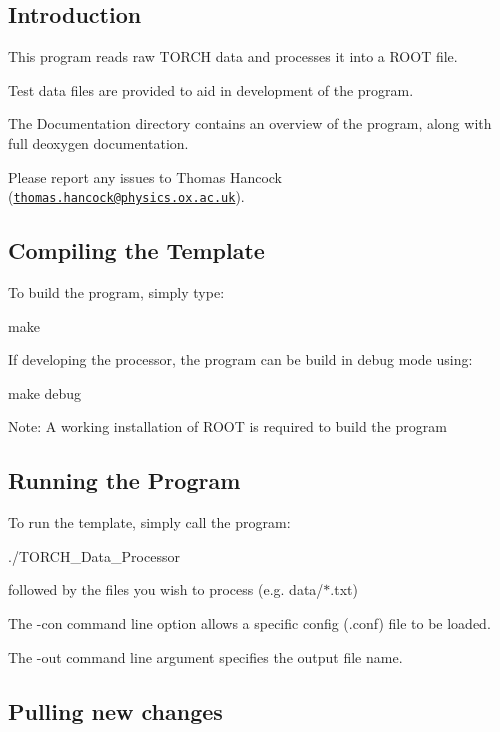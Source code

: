 \subsection*{Introduction}

This program reads raw T\+O\+R\+CH data and processes it into a R\+O\+OT file.

Test data files are provided to aid in development of the program.

The {\ttfamily Documentation} directory contains an overview of the program, along with full deoxygen documentation.

Please report any issues to Thomas Hancock (\href{mailto:thomas.hancock@physics.ox.ac.uk}{\tt thomas.\+hancock@physics.\+ox.\+ac.\+uk}).

\subsection*{Compiling the Template}

To build the program, simply type\+: 
\begin{DoxyCode}
make
\end{DoxyCode}


If developing the processor, the program can be build in debug mode using\+: 
\begin{DoxyCode}
make debug
\end{DoxyCode}


Note\+: A working installation of R\+O\+OT is required to build the program

\subsection*{Running the Program}

To run the template, simply call the program\+: 
\begin{DoxyCode}
./TORCH\_Data\_Processor
\end{DoxyCode}
 followed by the files you wish to process (e.\+g. {\ttfamily data/$\ast$.txt})

The {\ttfamily -\/con} command line option allows a specific config ({\ttfamily .conf}) file to be loaded.

The {\ttfamily -\/out} command line argument specifies the output file name.

\subsection*{Pulling new changes}

